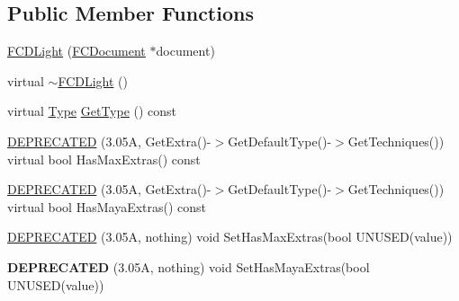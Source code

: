 \subsection*{Public Member Functions}
\begin{DoxyCompactItemize}
\item 
\hyperlink{classFCDLight_aaf95e04d9a0fabdd2fa9d0e58884c9da}{FCDLight} (\hyperlink{classFCDocument}{FCDocument} $\ast$document)
\item 
virtual \hyperlink{classFCDLight_a1d1691af54cdf575c315978724445d0f}{$\sim$FCDLight} ()
\item 
virtual \hyperlink{classFCDEntity_a9301a4bd5f4d4190ec13e40db4effdd7}{Type} \hyperlink{classFCDLight_a846e07aee92d19dd745a98462a9ffd74}{GetType} () const 
\item 
\hyperlink{classFCDLight_a79f78c8ab362a43382aca2ca17009242}{DEPRECATED} (3.05A, GetExtra()-\/$>$GetDefaultType()-\/$>$GetTechniques()) virtual bool HasMaxExtras() const 
\item 
\hyperlink{classFCDLight_a6abbb56f9c405ea01142624563e98da4}{DEPRECATED} (3.05A, GetExtra()-\/$>$GetDefaultType()-\/$>$GetTechniques()) virtual bool HasMayaExtras() const 
\item 
\hyperlink{classFCDLight_acdbb83fef4b9a591f275c45e189e17d0}{DEPRECATED} (3.05A, nothing) void SetHasMaxExtras(bool UNUSED(value))
\item 
\hypertarget{classFCDLight_a772b1b8220e7e8d3e8d60a342962116a}{
{\bfseries DEPRECATED} (3.05A, nothing) void SetHasMayaExtras(bool UNUSED(value))}
\label{classFCDLight_a772b1b8220e7e8d3e8d60a342962116a}


\end{DoxyCompactItemize}
